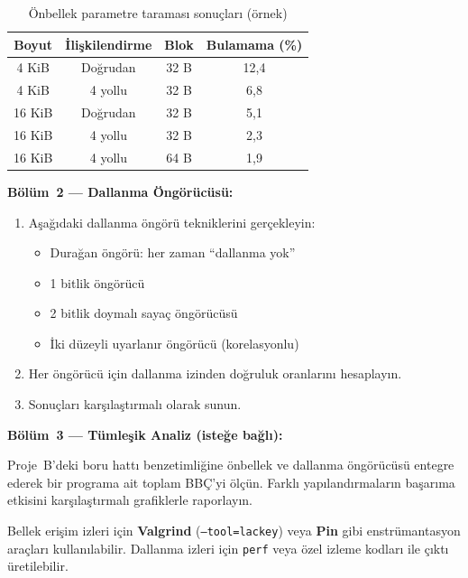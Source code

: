 \begin{table}[H]
\centering
\caption[Önbellek parametre taraması örneği]{Önbellek parametre taraması sonuçları (örnek)}
\label{tab:ekd-onbellek-tarama}
\begin{tabular}{@{}cccc@{}}
\toprule
\textbf{Boyut} & \textbf{İlişkilendirme} & \textbf{Blok} & \textbf{Bulamama (\%)} \\
\midrule
4 KiB   & Doğrudan   & 32 B & 12{,}4 \\
4 KiB   & 4 yollu    & 32 B &  6{,}8 \\
16 KiB  & Doğrudan   & 32 B &  5{,}1 \\
16 KiB  & 4 yollu    & 32 B &  2{,}3 \\
16 KiB  & 4 yollu    & 64 B &  1{,}9 \\
\bottomrule
\end{tabular}
\end{table}

\textbf{Bölüm~2 --- Dallanma Öngörücüsü:}
\begin{enumerate}[leftmargin=2em]
    \item Aşağıdaki dallanma öngörü tekniklerini gerçekleyin:
    \begin{itemize}[leftmargin=1.5em]
        \item Durağan öngörü: her zaman ``dallanma yok''
        \item 1 bitlik öngörücü
        \item 2 bitlik doymalı sayaç öngörücüsü
        \item İki düzeyli uyarlanır öngörücü (korelasyonlu)
    \end{itemize}
    \item Her öngörücü için dallanma izinden doğruluk oranlarını hesaplayın.
    \item Sonuçları karşılaştırmalı olarak sunun.
\end{enumerate}

\textbf{Bölüm~3 --- Tümleşik Analiz (isteğe bağlı):}

Proje~B'deki boru hattı benzetimliğine önbellek ve dallanma öngörücüsü entegre ederek bir programa ait toplam BBÇ'yi ölçün. Farklı yapılandırmaların başarıma etkisini karşılaştırmalı grafiklerle raporlayın.

\begin{bilginot}
Bellek erişim izleri için \textbf{Valgrind} (\texttt{--tool=lackey}) veya \textbf{Pin} gibi enstrümantasyon araçları kullanılabilir. Dallanma izleri için \texttt{perf} veya özel izleme kodları ile çıktı üretilebilir.
\end{bilginot}


